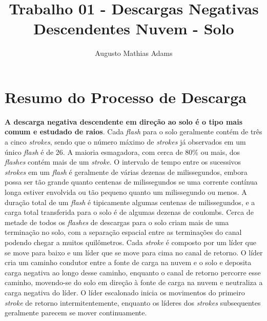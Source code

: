 \documentclass[a4paper, 12pt, onecolumn,singlespacing]{article}
\title{Trabalho 01 - Descargas Negativas Descendentes Nuvem - Solo}
\author[1]{Augusto Mathias Adams}
\affil[1]{augusto.adams@ufpr.br}
\begin{document}
	
	\maketitle

	\section{Resumo do Processo de Descarga}
	
	\textbf{A descarga negativa descendente em direção ao solo é o tipo mais comum e estudado de raios}. Cada \textit{flash} para o solo geralmente contém de três a cinco \textit{strokes}, sendo que o número máximo de \textit{strokes} já observados em um único \textit{flash} é de 26. A maioria esmagadora, com cerca de 80\% ou mais, dos \textit{flashes} contém mais de um \textit{stroke}. O intervalo de tempo entre os sucessivos \textit{strokes} em um \textit{flash} é geralmente de várias dezenas de milissegundos, embora possa ser tão grande quanto centenas de milissegundos se uma corrente contínua longa estiver envolvida ou tão pequeno quanto um milissegundo ou menos. A duração total de um \textit{flash} é tipicamente algumas centenas de milissegundos, e a carga total transferida para o solo é de algumas dezenas de coulombs. Cerca de metade de todos os \textit{flashes} de descargas para o solo criam mais de uma terminação no solo, com a separação espacial entre as terminações do canal podendo chegar a muitos quilômetros. Cada \textit{stroke} é composto por um líder que se move para baixo e um líder que se move para cima no canal de retorno. O líder cria um caminho condutor entre a fonte de carga na nuvem e o solo e deposita carga negativa ao longo desse caminho, enquanto o canal de retorno percorre esse caminho, movendo-se do solo em direção à fonte de carga na nuvem e neutraliza a carga negativa do líder. O líder escalonado inicia os movimentos do primeiro \textit{stroke} de retorno intermitentemente, enquanto os líderes dos \textit{strokes} subsequentes geralmente parecem se mover continuamente\cite{RAKOV_UHMAN}.
	
\end{document}
